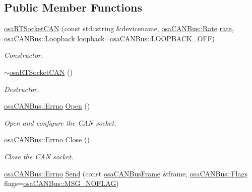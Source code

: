 \subsection*{Public Member Functions}
\begin{DoxyCompactItemize}
\item 
\hyperlink{classosa_r_t_socket_c_a_n_aeb6f32acd0d63e2cb60adda735b71b9e}{osa\-R\-T\-Socket\-C\-A\-N} (const std\-::string \&devicename, \hyperlink{classosa_c_a_n_bus_ae977dbc0e1c16772395408c8e018fe6c}{osa\-C\-A\-N\-Bus\-::\-Rate} \hyperlink{classosa_c_a_n_bus_a4ff86a9ecf19161b1f34666888e0a331}{rate}, \hyperlink{classosa_c_a_n_bus_a992406c83a336e95fb4a09b0b13df786}{osa\-C\-A\-N\-Bus\-::\-Loopback} \hyperlink{classosa_c_a_n_bus_a724e9c478dd48908882e29f189d98968}{loopback}=\hyperlink{classosa_c_a_n_bus_a992406c83a336e95fb4a09b0b13df786ae2557509d0c1ac68029eeb6bdf6e703d}{osa\-C\-A\-N\-Bus\-::\-L\-O\-O\-P\-B\-A\-C\-K\-\_\-\-O\-F\-F})
\begin{DoxyCompactList}\small\item\em Constructor. \end{DoxyCompactList}\item 
\hyperlink{classosa_r_t_socket_c_a_n_a8f80713456b4c1f7514030f8cd320af7}{$\sim$osa\-R\-T\-Socket\-C\-A\-N} ()
\begin{DoxyCompactList}\small\item\em Destructor. \end{DoxyCompactList}\item 
\hyperlink{classosa_c_a_n_bus_a6fa3e95ec4c36932d0640e40e0748fde}{osa\-C\-A\-N\-Bus\-::\-Errno} \hyperlink{classosa_r_t_socket_c_a_n_a68885fe9f90ca673958caaa6f0e4a251}{Open} ()
\begin{DoxyCompactList}\small\item\em Open and configure the C\-A\-N socket. \end{DoxyCompactList}\item 
\hyperlink{classosa_c_a_n_bus_a6fa3e95ec4c36932d0640e40e0748fde}{osa\-C\-A\-N\-Bus\-::\-Errno} \hyperlink{classosa_r_t_socket_c_a_n_a74c55b778afb9a7ae633f3714d99003c}{Close} ()
\begin{DoxyCompactList}\small\item\em Close the C\-A\-N socket. \end{DoxyCompactList}\item 
\hyperlink{classosa_c_a_n_bus_a6fa3e95ec4c36932d0640e40e0748fde}{osa\-C\-A\-N\-Bus\-::\-Errno} \hyperlink{classosa_r_t_socket_c_a_n_aa1f62bdadfb3481ca3f96a8152e22508}{Send} (const \hyperlink{classosa_c_a_n_bus_frame}{osa\-C\-A\-N\-Bus\-Frame} \&frame, \hyperlink{classosa_c_a_n_bus_a74fe35c6059237887431f3ccece7b21b}{osa\-C\-A\-N\-Bus\-::\-Flags} flags=\hyperlink{classosa_c_a_n_bus_a74fe35c6059237887431f3ccece7b21ba30f701fa6e0dba6e274540941ccd3978}{osa\-C\-A\-N\-Bus\-::\-M\-S\-G\-\_\-\-N\-O\-F\-L\-A\-G})

\end{DoxyCompactItemize}
